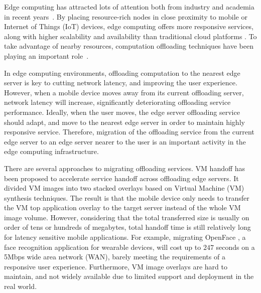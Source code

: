 
Edge computing has attracted lots of attention both from industry and academia in recent years~\cite{satya2009case,MEC2014initiative,MEC2015-5G,yi2015fog,yi2015survey,yi2015security,hao2016edgestore,shi2016edge,chiang2016fog,satya2017edge,hao2017challenges}. 
By placing resource-rich nodes in close proximity to mobile or Internet of Things (IoT) devices, edge computing offers more responsive services, along with higher scalability and availability than traditional cloud platforms  \cite{MEC2014initiative, satya2017edge}.
To take advantage of nearby resources, computation offloading techniques have been playing an important role~\cite{cuervo2010maui,lane2016deepx,openface2016,liu2016paradrop}.

In edge computing environments, offloading computation to the nearest edge server is key to cutting network latency, and improving the user experience. 
However, when a mobile device moves away from its current offloading server, network latency will increase, significantly deteriorating offloading service performance. Ideally, when the user moves, the edge server offloading service should adapt, and move to the nearest edge server in order to maintain highly responsive service. 
Therefore, migration of the offloading service from the current edge server to an edge server nearer to the user is an important activity in the edge computing infrastructure. 

There are several approaches to migrating offloading services. 
VM handoff \cite{ha2015vmhandoff} has been proposed to accelerate service handoff across offloading edge servers. It divided VM images into two stacked overlays based on Virtual Machine (VM) synthesis \cite{satya2009case} techniques. 
The result is that the mobile device only needs to transfer the VM top application overlay to the target server instead of the whole VM image volume. However, considering that the total transferred size is usually on order of tens or hundreds of megabytes, total handoff time is still relatively long for latency sensitive mobile applications. For example, migrating OpenFace \cite{openface2016}, a face recognition application for wearable devices, will cost up to $247$ seconds on a 5Mbps wide area network (WAN), barely meeting the requirements of a responsive user experience. 
Furthermore, VM image overlays are hard to maintain, and not widely available due to limited support and deployment in the real world.

